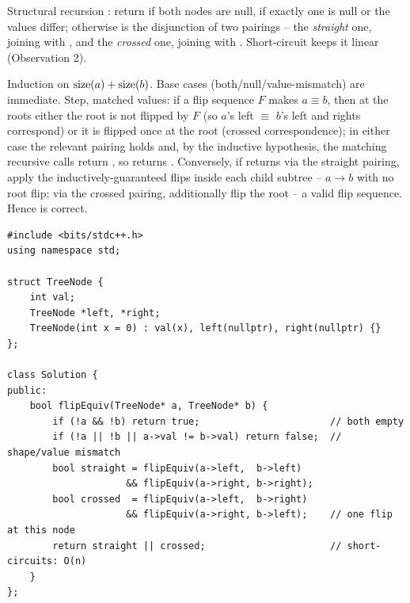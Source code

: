 Structural recursion : return  if both nodes are null,
 if exactly one is null or the values differ; otherwise  is
the disjunction of two pairings -- the \emph{straight} one, joining
 with , and the
\emph{crossed} one, joining  with
. Short-circuit keeps it linear (Observation 2).

\begin{proofbox}
Induction on $\operatorname{size}(a)+\operatorname{size}(b)$. Base cases (both/null/value-mismatch) are
immediate. Step, matched values: if a flip sequence $F$ makes $a\equiv b$, then at
the roots either the root is not flipped by $F$ (so $a$'s left $\equiv$ $b$'s left
and rights correspond) or it is flipped once at the root (crossed correspondence);
in either case the relevant pairing holds and, by the inductive hypothesis, the
matching recursive calls return , so  returns .
Conversely, if  returns  via the straight pairing, apply the
inductively-guaranteed flips inside each child subtree -- $a\to b$ with no root
flip; via the crossed pairing, additionally flip the root -- a valid flip sequence.
Hence  is correct.
\end{proofbox}

\begin{lstlisting}[caption={Flip Equivalent Binary Trees (LeetCode 951) -- straight-or-crossed recursion}, label={lst:c02-flip-eq}]
#include <bits/stdc++.h>
using namespace std;

struct TreeNode {
    int val;
    TreeNode *left, *right;
    TreeNode(int x = 0) : val(x), left(nullptr), right(nullptr) {}
};

class Solution {
public:
    bool flipEquiv(TreeNode* a, TreeNode* b) {
        if (!a && !b) return true;                       // both empty
        if (!a || !b || a->val != b->val) return false;  // shape/value mismatch
        bool straight = flipEquiv(a->left,  b->left)
                     && flipEquiv(a->right, b->right);
        bool crossed  = flipEquiv(a->left,  b->right)
                     && flipEquiv(a->right, b->left);    // one flip at this node
        return straight || crossed;                      // short-circuits: O(n)
    }
};
\end{lstlisting}


